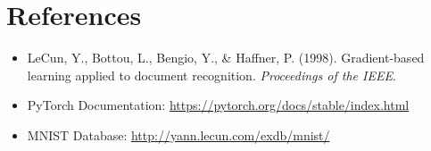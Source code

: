 \documentclass{article}
\begin{document}
\section{References}
\begin{itemize}
    \item LeCun, Y., Bottou, L., Bengio, Y., \& Haffner, P. (1998). Gradient-based learning applied to document recognition. \textit{Proceedings of the IEEE}.
    \item PyTorch Documentation: \url{https://pytorch.org/docs/stable/index.html}
    \item MNIST Database: \url{http://yann.lecun.com/exdb/mnist/}
\end{itemize}
\end{document}
